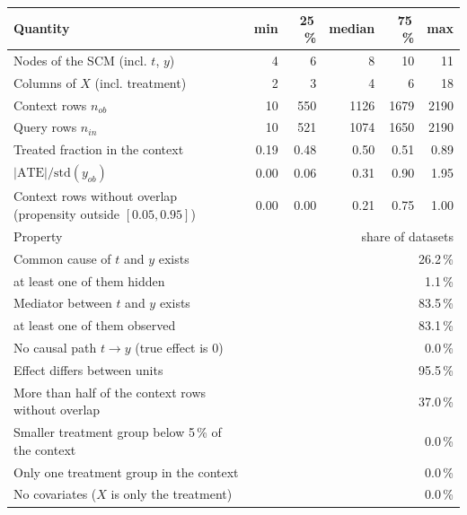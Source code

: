 \begin{tabular}{lrrrrr}
\toprule
Quantity & min & 25\,\% & median & 75\,\% & max \\
\midrule
Nodes of the SCM (incl. $t$, $y$) & 4 & 6 & 8 & 10 & 11 \\
Columns of $X$ (incl. treatment) & 2 & 3 & 4 & 6 & 18 \\
Context rows $n_{ob}$ & 10 & 550 & 1126 & 1679 & 2190 \\
Query rows $n_{in}$ & 10 & 521 & 1074 & 1650 & 2190 \\
Treated fraction in the context & 0.19 & 0.48 & 0.50 & 0.51 & 0.89 \\
$|\mathrm{ATE}| / \mathrm{std}(y_{ob})$ & 0.00 & 0.06 & 0.31 & 0.90 & 1.95 \\
Context rows without overlap (propensity outside $[0.05, 0.95]$) & 0.00 & 0.00 & 0.21 & 0.75 & 1.00 \\
\midrule
Property & \multicolumn{5}{r}{share of datasets} \\
\midrule
Common cause of $t$ and $y$ exists & \multicolumn{5}{r}{26.2\,\%} \\
\quad at least one of them hidden & \multicolumn{5}{r}{1.1\,\%} \\
Mediator between $t$ and $y$ exists & \multicolumn{5}{r}{83.5\,\%} \\
\quad at least one of them observed & \multicolumn{5}{r}{83.1\,\%} \\
No causal path $t \to y$ (true effect is 0) & \multicolumn{5}{r}{0.0\,\%} \\
Effect differs between units & \multicolumn{5}{r}{95.5\,\%} \\
More than half of the context rows without overlap & \multicolumn{5}{r}{37.0\,\%} \\
Smaller treatment group below 5\,\% of the context & \multicolumn{5}{r}{0.0\,\%} \\
Only one treatment group in the context & \multicolumn{5}{r}{0.0\,\%} \\
No covariates ($X$ is only the treatment) & \multicolumn{5}{r}{0.0\,\%} \\
\bottomrule
\end{tabular}

